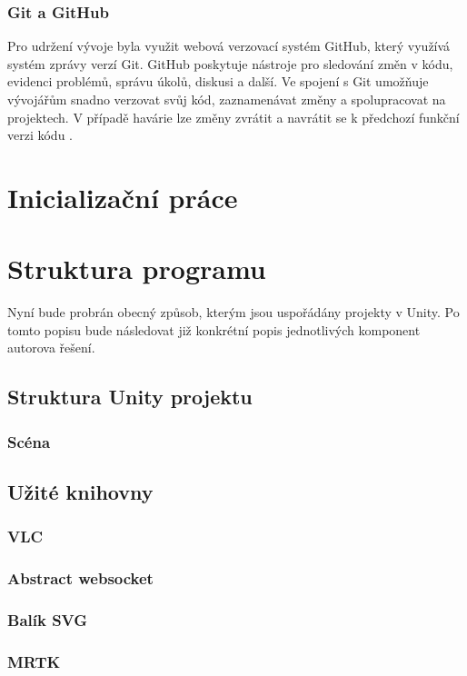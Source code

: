 \subsubsection{Git a GitHub}
Pro udržení vývoje byla využit webová verzovací systém GitHub, který využívá systém zprávy verzí Git. GitHub poskytuje nástroje pro sledování změn v kódu, evidenci problémů, správu úkolů, diskusi a další. Ve spojení s Git umožňuje vývojářům snadno verzovat svůj kód, zaznamenávat změny a spolupracovat na projektech. V případě havárie lze změny zvrátit a navrátit se k předchozí funkční verzi kódu \cite{gitGithub}. 

\section{Inicializační práce}
\newpage
\section{Struktura programu}\label{SEC:StrukturaProgramu}
Nyní bude probrán obecný způsob, kterým jsou uspořádány projekty v Unity. Po tomto popisu bude následovat již konkrétní popis jednotlivých komponent autorova řešení. 
\subsection{Struktura Unity projektu}

\subsubsection{Scéna}
\subsection{Užité knihovny}
\subsubsection{VLC}
\subsubsection{Abstract websocket}
\subsubsection{Balík SVG}
\subsubsection{MRTK}

